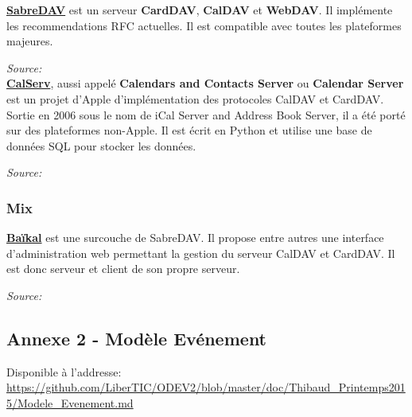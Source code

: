 \underline{\textbf{SabreDAV}} est un serveur \textbf{CardDAV}, \textbf{CalDAV} et \textbf{WebDAV}. Il implémente les recommendations RFC actuelles. Il est compatible avec toutes les plateformes majeures.

\textit{Source: }\\

\underline{\textbf{CalServ}}, aussi appelé \textbf{Calendars and Contacts Server} ou \textbf{Calendar Server} est un projet d'Apple d'implémentation des protocoles CalDAV et CardDAV. Sortie en 2006 sous le nom de iCal Server and Address Book Server, il a été porté sur des plateformes non-Apple. Il est écrit en Python et utilise une base de données SQL pour stocker les données.

\textit{Source: }\\


\subsubsection*{Mix}

\underline{\textbf{Baïkal}} est une surcouche de SabreDAV. Il propose entre autres une interface d'administration web permettant la gestion du serveur CalDAV et CardDAV. Il est donc serveur et client de son propre serveur.

\textit{Source: }

\clearpage

\subsection*{Annexe 2 - Modèle Evénement}

Disponible à l'addresse: \url{https://github.com/LiberTIC/ODEV2/blob/master/doc/Thibaud_Printemps2015/Modele_Evenement.md}

